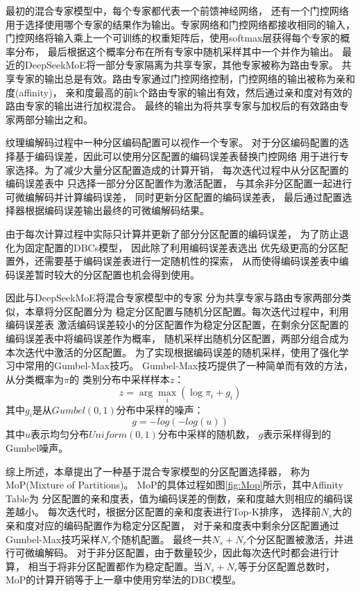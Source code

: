 最初的混合专家模型中，每个专家都代表一个前馈神经网络，
还有一个门控网络用于选择使用哪个专家的结果作为输出。专家网络和门控网络都接收相同的输入，
门控网络将输入乘上一个可训练的权重矩阵后，使用softmax层获得每个专家的概率分布，
最后根据这个概率分布在所有专家中随机采样其中一个并作为输出。
最近的DeepSeekMoE\cite{dai2024deepseekmoe}将一部分专家隔离为共享专家，其他专家被称为路由专家。
共享专家的输出总是有效。路由专家通过门控网络控制，门控网络的输出被称为亲和度(affinity)，
亲和度最高的前k个路由专家的输出有效，然后通过亲和度对有效的路由专家的输出进行加权混合。
最终的输出为将共享专家与加权后的有效路由专家两部分输出之和。

纹理编解码过程中一种分区编码配置可以视作一个专家。
对于分区编码配置的选择基于编码误差，因此可以使用分区配置的编码误差表替换门控网络
用于进行专家选择。为了减少大量分区配置造成的计算开销，
每次迭代过程中从分区配置的编码误差表中
只选择一部分分区配置作为激活配置，
与其余非分区配置一起进行可微编解码并计算编码误差，
同时更新分区配置的编码误差表，
最后通过配置选择器根据编码误差输出最终的可微编解码结果。

由于每次计算过程中实际只计算并更新了部分分区配置的编码误差，
为了防止退化为固定配置的DBCs模型，
因此除了利用编码误差表选出
优先级更高的分区配置外，还需要基于编码误差表进行一定随机性的探索，
从而使得编码误差表中编码误差暂时较大的分区配置也机会得到使用。

因此与DeepSeekMoE\cite{dai2024deepseekmoe}将混合专家模型中的专家
分为共享专家与路由专家两部分类似，本章将分区配置分为
稳定分区配置与随机分区配置。每次迭代过程中，利用编码误差表
激活编码误差较小的分区配置作为稳定分区配置，在剩余分区配置的编码误差表中将编码误差作为概率，
随机采样出随机分区配置，两部分组合成为本次迭代中激活的分区配置。
为了实现根据编码误差的随机采样，使用了强化学习中常用的Gumbel-Max技巧\cite{jang2016categorical}。
Gumbel-Max技巧提供了一种简单而有效的方法，从分类概率为$\pi$的
类别分布中采样样本$z$：
\begin{equation}
z = \arg\max_i \left( \log\pi_i + g_i \right)
\end{equation}
其中$g_i$是从$Gumbel(0, 1)$分布中采样的噪声：
\begin{equation}
    g = -log(-log(u))
\end{equation}
其中$u$表示均匀分布$Uniform(0, 1)$分布中采样的随机数，
$g$表示采样得到的Gumbel噪声。

综上所述，本章提出了一种基于混合专家模型的分区配置选择器，
称为MoP(Mixture of Partitions)。
MoP的具体过程如图\ref{fig:Mop}所示，其中Affinity Table为
分区配置的亲和度表，值为编码误差的倒数，亲和度越大则相应的编码误差越小。
每次迭代时，根据分区配置的亲和度表进行Top-K排序，
选择前$N_s$大的亲和度对应的编码配置作为稳定分区配置，
对于亲和度表中剩余分区配置通过Gumbel-Max技巧采样$N_r$个随机配置。
最终一共$N_s+N_r$个分区配置被激活，并进行可微编解码。
对于非分区配置，由于数量较少，因此每次迭代时都会进行计算，
相当于将非分区配置都作为稳定配置。当$N_s+N_r$等于分区配置总数时，
MoP的计算开销等于上一章中使用穷举法的DBC模型。

